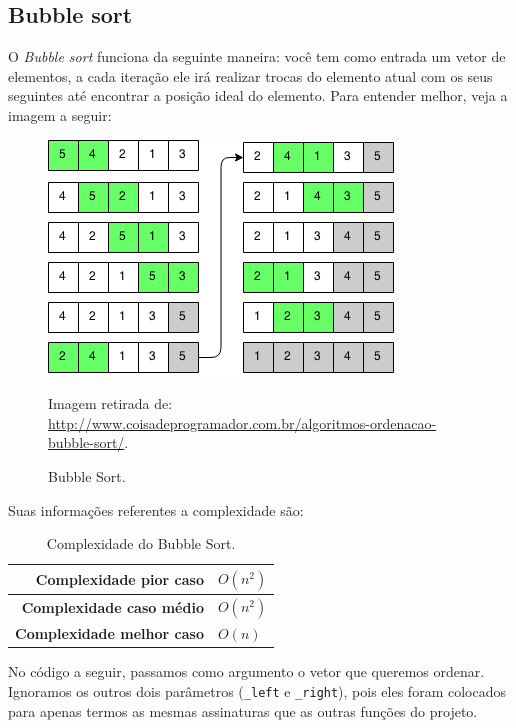 

\subsection{Bubble sort}
O \textit{Bubble sort} funciona da seguinte maneira: você tem como entrada um vetor de elementos, a cada iteração ele irá realizar trocas do elemento atual com os seus seguintes até encontrar a posição ideal do elemento. Para entender melhor, veja a imagem a seguir:

\begin{figure}[!htb]
	\centering
	\includegraphics{img/bubble-sort.png}
	\caption{Bubble Sort.}
	\small{Imagem retirada de: \url{http://www.coisadeprogramador.com.br/algoritmos-ordenacao-bubble-sort/}.}
	\label{bubble-sort}
\end{figure}

Suas informações referentes a complexidade são:

\begin{table}[H]
 \centering
	\begin{tabular}{| r | l |}
		\hline
		\textbf{Complexidade pior caso}   & $O(n^{2})$ \\
		\hline
		\textbf{Complexidade caso médio}  & $O(n^{2})$ \\
		\hline
		\textbf{Complexidade melhor caso} & $O(n)$ \\
		\hline
	\end{tabular}
	\caption{Complexidade do Bubble Sort.}
	\label{t_bubble_sort}
\end{table}

No código a seguir, passamos como argumento o vetor que queremos ordenar. Ignoramos os outros dois parâmetros (\texttt{\_left} e \texttt{\_right}), pois eles foram colocados para apenas termos as mesmas assinaturas que as outras funções do projeto.



